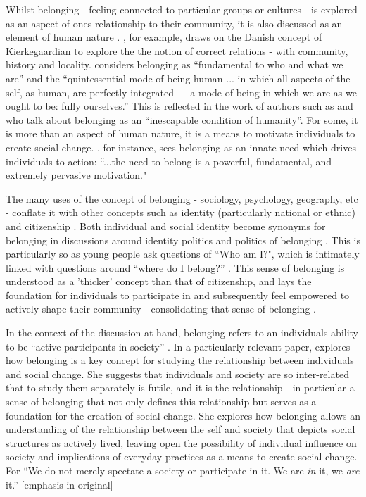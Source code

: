 \label{BelongingSoc}
Whilst belonging - feeling connected to particular groups or cultures - is explored as an aspect of ones relationship to their community, it is also discussed as an element of human nature \citep{Antonsich2010}. \citet{Miller2003}, for example, draws on the Danish concept of Kierkegaardian to explore the the notion of correct relations - with community, history and locality. \citet[][p217-8]{Miller2003} considers belonging as “fundamental to who and what we are” and the “quintessential mode of being human ... in which all aspects of the self, as human, are perfectly integrated — a mode of being in which we are as we ought to be: fully ourselves.” This is reflected in the work of authors such as \citet{Calhoun2003} and \citet[][p16]{Antonsich2010} who talk about belonging as an “inescapable condition of humanity”. For some, it is more than an aspect of human nature, it is a means to motivate individuals to create social change. \citet[][p497]{Baumeister1995}, for instance, sees belonging as an innate need which drives individuals to action: “...the need to belong is a powerful, fundamental, and extremely pervasive motivation."


The many uses of the concept of belonging - sociology, psychology, geography, etc - conflate it with other concepts such as identity (particularly national or ethnic) and citizenship \citep{Antonsich2010}. Both individual and social identity become synonyms for belonging in discussions around identity politics and politics of belonging \citep{Antonsich2010}. This is particularly so as young people ask questions of “Who am I?", which is intimately linked with questions around “where do I belong?” \citep{Loader2006}. This sense of belonging is understood as a 'thicker' concept than that of citizenship, and lays the foundation for individuals to participate in and subsequently feel empowered to actively shape their community - consolidating that sense of belonging \citep{Antonsich2010,Mee2009}. 



In the context of the discussion at hand, belonging refers to an individuals ability to be “active participants in society” \citep[][p367]{May2011}. In a particularly relevant paper, \citet{May2011} explores how belonging is a key concept for studying the relationship between individuals and social change. She suggests that individuals and society are so inter-related that to study them separately is futile, and it is the relationship - in particular a sense of belonging that not only defines this relationship but serves as a foundation for the creation of social change. She explores how belonging allows an understanding of the relationship between the self and society that depicts social structures as actively lived, leaving open the possibility of individual influence on society and implications of everyday practices as a means to create social change. For \citet[][p375]{May2011} “We do not merely spectate a society or participate in it. We are \textit{in} it, we \textit{are} it.” [emphasis in original]


